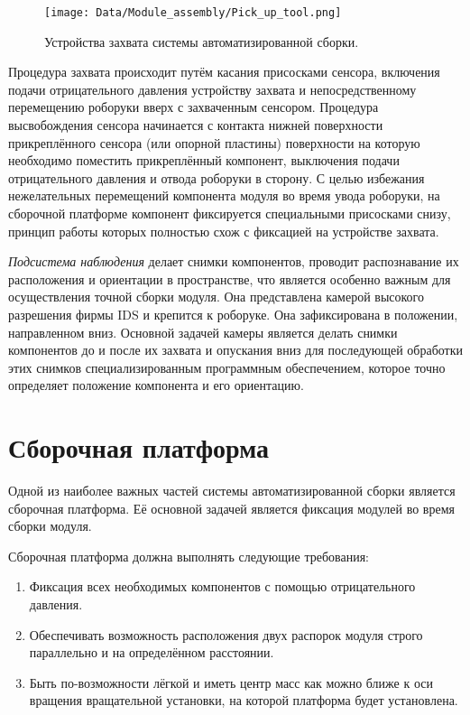 \begin{figure}[ht]\centering
\texttt{[image: Data/Module\_assembly/Pick\_up\_tool.png]}
\caption{Устройства захвата системы автоматизированной сборки.}
\label{fig:pick_up_tool}
\end{figure}

Процедура захвата происходит путём касания присосками сенсора, включения подачи отрицательного давления устройству захвата и непосредственному перемещению роборуки вверх с захваченным сенсором. Процедура высвобождения сенсора начинается с контакта нижней поверхности прикреплённого сенсора (или опорной пластины) поверхности на которую необходимо поместить прикреплённый компонент, выключения подачи отрицательного давления и отвода роборуки в сторону. С целью избежания нежелательных перемещений компонента модуля во время увода роборуки, на сборочной платформе компонент фиксируется специальными присосками снизу, принцип работы которых полностью схож с фиксацией на устройстве захвата.

\emph{Подсистема наблюдения} делает снимки компонентов, проводит распознавание их расположения и ориентации в пространстве, что является особенно важным для осуществления точной сборки модуля. Она представлена камерой высокого разрешения фирмы IDS и крепится к роборуке. Она зафиксирована в положении, направленном вниз. Основной задачей камеры является делать снимки компонентов до и после их захвата и опускания вниз для последующей обработки этих снимков специализированным программным обеспечением, которое точно определяет положение компонента и его ориентацию.

\section{Сборочная платформа}

Одной из наиболее важных частей системы автоматизированной сборки является сборочная платформа. Её основной задачей является фиксация модулей во время сборки модуля.

Сборочная платформа должна выполнять следующие требования:

\begin{enumerate}
\setlength\itemsep{-0.5em}
\item Фиксация всех необходимых компонентов с помощью отрицательного давления.
\item Обеспечивать возможность расположения двух распорок модуля строго параллельно и на определённом расстоянии.
\item Быть по-возможности лёгкой и иметь центр масс как можно ближе к оси вращения вращательной установки, на которой платформа будет установлена.
\end{enumerate}

